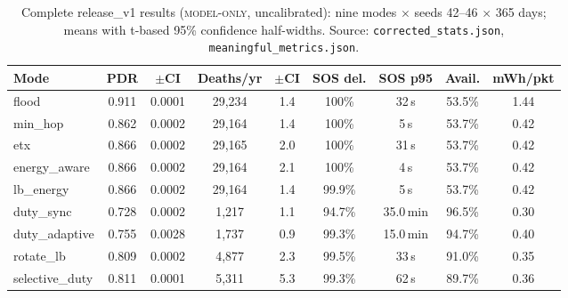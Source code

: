 \documentclass[11pt]{article}
\newcommand{\modelonly}{\textsc{model-only}}
\newcommand{\code}[1]{\texttt{\small #1}}
\begin{document}
\begin{table}[h]
\centering\small
\setlength{\tabcolsep}{4pt}
\begin{tabular}{@{}lcccccccc@{}}
\toprule
Mode & PDR & $\pm$CI & Deaths/yr & $\pm$CI & SOS del. & SOS p95 & Avail. & mWh/pkt \\
\midrule
flood          & 0.911 & 0.0001 & 29{,}234 & 1.4 & 100\%  & 32\,s     & 53.5\% & 1.44 \\
min\_hop       & 0.862 & 0.0002 & 29{,}164 & 1.4 & 100\%  & 5\,s      & 53.7\% & 0.42 \\
etx            & 0.866 & 0.0002 & 29{,}165 & 2.0 & 100\%  & 31\,s     & 53.7\% & 0.42 \\
energy\_aware  & 0.866 & 0.0002 & 29{,}164 & 2.1 & 100\%  & 4\,s      & 53.7\% & 0.42 \\
lb\_energy     & 0.866 & 0.0002 & 29{,}164 & 1.4 & 99.9\% & 5\,s      & 53.7\% & 0.42 \\
duty\_sync     & 0.728 & 0.0002 & 1{,}217  & 1.1 & 94.7\% & 35.0\,min & 96.5\% & 0.30 \\
duty\_adaptive & 0.755 & 0.0028 & 1{,}737  & 0.9 & 99.3\% & 15.0\,min & 94.7\% & 0.40 \\
rotate\_lb     & 0.809 & 0.0002 & 4{,}877  & 2.3 & 99.5\% & 33\,s     & 91.0\% & 0.35 \\
selective\_duty& 0.811 & 0.0001 & 5{,}311  & 5.3 & 99.3\% & 62\,s     & 89.7\% & 0.36 \\
\bottomrule
\end{tabular}
\caption{Complete release\_v1 results (\modelonly, uncalibrated): nine modes
$\times$ seeds 42--46 $\times$ 365 days; means with t-based 95\% confidence
half-widths. Source: \code{corrected\_stats.json},
\code{meaningful\_metrics.json}.}
\end{table}
\end{document}

